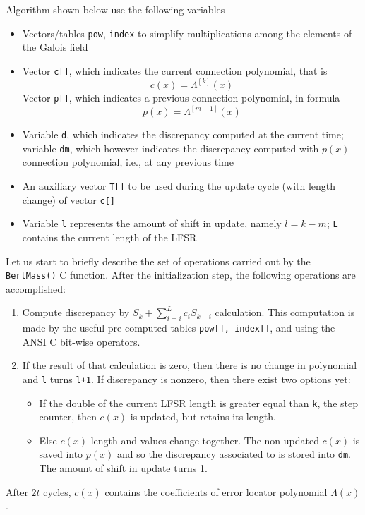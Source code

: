 Algorithm shown below use the following variables
\begin{itemize}
\item Vectors/tables \texttt{pow}, \texttt{index} to simplify multiplications among the elements of the Galois field
\item Vector \texttt{c[]}, which indicates the current connection polynomial, that is \[ c(x) = \Lambda^{[k]}(x)\]
Vector \texttt{p[]}, which indicates a previous connection polynomial, in formula
\[ p(x)=\Lambda^{[m-1]}(x)\]
\item Variable \texttt{d}, which indicates the discrepancy computed at the current time; variable \texttt{dm}, which however indicates the discrepancy computed with \(p(x)\) connection polynomial, i.e., at any previous time
\item An auxiliary vector \texttt{T[]} to be used during the update cycle (with length change) of vector \texttt{c[]}
\item Variable \texttt{l} represents the amount of shift in update, namely \(l = k-m\); \texttt{L} contains the current length of the LFSR
\end{itemize}

Let us start to briefly describe the set of operations carried out by the \texttt{BerlMass()} C function. After the initialization step, the following operations are accomplished:
\begin{enumerate}
\item Compute discrepancy by \(S_k+ \sum_{i = i}^{L} {c_i S_{k-i}}\) calculation. This computation is made by the useful pre-computed tables \texttt{pow[], index[]}, and using the ANSI C bit-wise operators.
\item If the result of that calculation is zero, then there is no change in polynomial and \texttt{l} turns \texttt{l+1}. If discrepancy is nonzero, then there exist two options yet:
    \begin{itemize}
    \item If the double of the current LFSR length is greater equal than \texttt{k}, the step counter, then \(c(x)\) is updated, but retains its length.
    \item Else \(c(x)\) length and values change together. The non-updated \(c(x)\) is saved into \(p(x)\) and so the discrepancy associated to is stored into \texttt{dm}. The amount of shift in update turns 1.
    \end{itemize}
\end{enumerate}
After \(2t\) cycles, \(c(x)\) contains the coefficients of error locator polynomial \(\Lambda(x)\).



